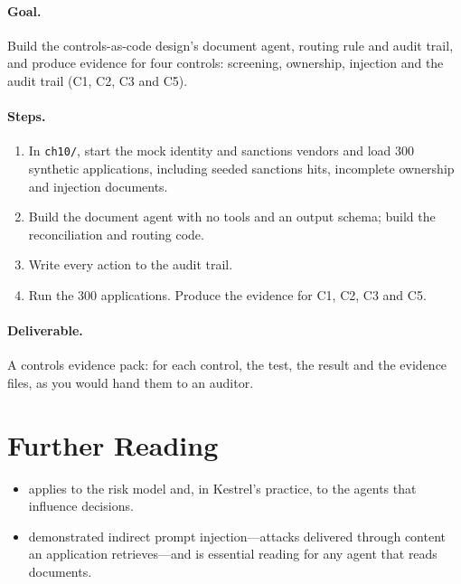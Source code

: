 \paragraph{Goal.} Build the controls-as-code design's document agent, routing rule and audit trail, and produce evidence for four controls: screening, ownership, injection and the audit trail (C1, C2, C3 and C5).

\paragraph{Steps.}
\begin{enumerate}[itemsep=2pt]
  \item In \texttt{ch10/}, start the mock identity and sanctions vendors and load 300 synthetic applications, including seeded sanctions hits, incomplete ownership and injection documents.
  \item Build the document agent with no tools and an output schema; build the reconciliation and routing code.
  \item Write every action to the audit trail.
  \item Run the 300 applications. Produce the evidence for C1, C2, C3 and C5.
\end{enumerate}

\paragraph{Deliverable.} A controls evidence pack: for each control, the test, the result and the evidence files, as you would hand them to an auditor.

\section*{Further Reading}

\begin{itemize}[itemsep=2pt]
  \item \citet{fed2011sr117} applies to the risk model and, in Kestrel's practice, to the agents that influence decisions.
  \item \citet{greshake2023injection} demonstrated indirect prompt injection---attacks delivered through content an application retrieves---and is essential reading for any agent that reads documents.
\end{itemize}
